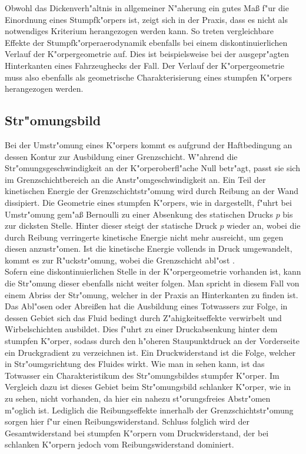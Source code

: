 Obwohl das Dickenverh"altnis in allgemeiner N"aherung ein gutes Ma\ss{} f"ur die Einordnung eines Stumpfk"orpers ist, zeigt sich in der Praxis, dass es nicht als notwendiges Kriterium herangezogen werden kann. So treten vergleichbare Effekte der Stumpfk"orperaerodynamik ebenfalls bei einem diskontinuierlichen Verlauf der K"orpergeometrie auf. Dies ist beispielsweise bei der ausgepr"agten Hinterkanten eines Fahrzeughecks der Fall. Der Verlauf der K"orpergeometrie muss also ebenfalls als geometrische Charakterisierung eines stumpfen K"orpers herangezogen werden.


\subsection{Str"omungsbild}
\label{sec:Stromungsbild}
Bei der Umstr"omung eines K"orpers kommt es aufgrund der Haftbedingung an dessen Kontur zur Ausbildung einer Grenzschicht. W"ahrend die Str"omungsgeschwindigkeit an der K"orperoberfl"ache Null betr"agt, passt sie sich im Grenzschichtbereich an die Anstr"omgeschwindigkeit an. Ein Teil der kinetischen Energie der Grenzschichtstr"omung wird durch Reibung an der Wand dissipiert.
Die Geometrie eines stumpfen K"orpers, wie in  dargestellt, f"uhrt bei Umstr"omung gem"a\ss{} Bernoulli zu einer Absenkung des statischen Drucks $p$ bis zur dicksten Stelle. Hinter dieser steigt der statische Druck $p$ wieder an, wobei die durch Reibung verringerte kinetische Energie nicht mehr ausreicht, um gegen diesen anzustr"omen. Ist die kinetische Energie vollends in Druck umgewandelt, kommt es zur R"uckstr"omung, wobei die Grenzschicht abl"ost \cite{Hucho.2011}.\\
Sofern eine diskontinuierlichen Stelle in der K"orpergeometrie vorhanden ist, kann die Str"omung dieser ebenfalls nicht weiter folgen. Man spricht in diesem Fall von einem Abriss der Str"omung, welcher in der Praxis an Hinterkanten zu finden ist.\\
Das Abl"osen oder Abrei\ss{}en hat die Ausbildung eines Totwassers zur Folge, in dessen Gebiet sich das Fluid bedingt durch Z"ahigkeitseffekte verwirbelt und Wirbelschichten ausbildet. Dies f"uhrt zu einer Druckabsenkung hinter dem stumpfen K"orper, sodass durch den h"oheren Staupunktdruck an der Vorderseite ein Druckgradient zu verzeichnen ist. Ein Druckwiderstand ist die Folge, welcher in Str"oumgsrichtung des Fluides wirkt. Wie man in  sehen kann, ist das Totwasser ein Charakteristikum des Str"omungsbildes stumpfer K"orper. Im Vergleich dazu ist dieses Gebiet beim Str"omungsbild schlanker K"orper, wie in  zu sehen, nicht vorhanden, da hier ein nahezu st"orungsfreies Abstr"omen m"oglich ist. Lediglich die Reibungseffekte innerhalb der Grenzschichtstr"omung sorgen hier f"ur einen Reibungswiderstand. Schluss folglich wird der Gesamtwiderstand bei stumpfen K"orpern vom Druckwiderstand, der bei schlanken K"orpern jedoch vom Reibungswiderstand dominiert.

